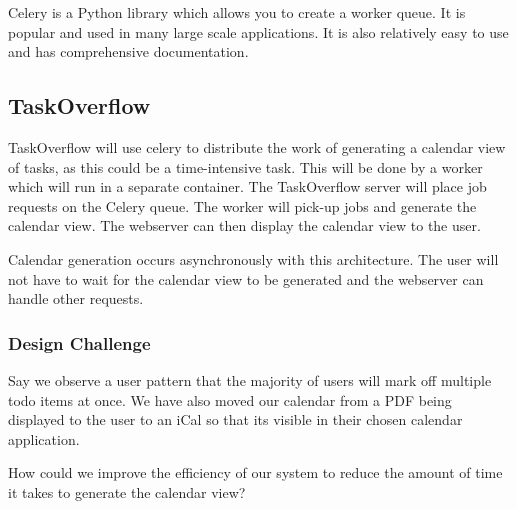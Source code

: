 \documentclass{csse4400}
\begin{document}
Celery is a Python library which allows you to create a worker queue.
It is popular and used in many large scale applications.
It is also relatively easy to use and has comprehensive documentation.


\subsection{TaskOverflow}

TaskOverflow will use celery to distribute the work of generating a calendar view of tasks,
as this could be a time-intensive task.
This will be done by a worker which will run in a separate container.
The TaskOverflow server will place job requests on the Celery queue.
The worker will pick-up jobs and generate the calendar view.
The webserver can then display the calendar view to the user.

Calendar generation occurs asynchronously with this architecture.
The user will not have to wait for the calendar view to be generated and the webserver can handle other requests.


\subsubsection{Design Challenge}

Say we observe a user pattern that the majority of users will mark off multiple todo items at once. We have also moved our calendar from a PDF being displayed to the user to an iCal so that its visible in their chosen calendar application.

How could we improve the efficiency of our system to reduce the amount of time it takes to generate the calendar view?



\end{document}

